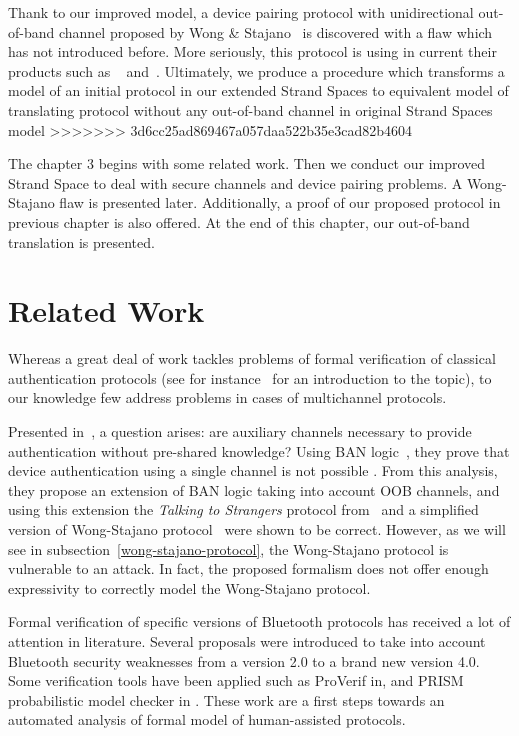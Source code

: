 Thank to our improved model, a device pairing protocol with unidirectional out-of-band channel proposed by Wong \& Stajano~\cite{10.1109/MPRV.2007.76} is discovered with a flaw which has not introduced before. More seriously, this protocol is using in current their products such as ~\cite{Stajano:2011aa} and~\cite{Stajano:2014aa}. Ultimately, we produce a procedure which transforms a model of an initial protocol in our extended Strand Spaces to equivalent model of translating protocol without any out-of-band channel in original Strand Spaces model
>>>>>>> 3d6cc25ad869467a057daa522b35e3cad82b4604

The chapter 3 begins with some related work. Then we conduct our improved Strand Space to deal with secure channels and device pairing problems. A Wong-Stajano flaw is presented later. Additionally, a proof of our proposed protocol in previous chapter is also offered. At the end of this chapter, our out-of-band translation is presented. 

\section{Related Work}
Whereas a great deal of work tackles problems of formal verification of classical authentication protocols (see for instance~\cite{Ryan:2000:MAS:1407727} for an introduction to the topic), to our knowledge few address problems in cases of multichannel protocols.

Presented in~\cite{jisis11-1-1-07}, a question arises: are auxiliary channels necessary to provide authentication without pre-shared knowledge? Using BAN logic~\cite{Burrows90alogic}, they prove that device authentication using a single channel is not possible . From this analysis, they propose an extension of BAN logic taking into account OOB channels, and using this extension the \textit{Talking to Strangers} protocol from~\cite{Smetters02talkingto} and a simplified version of Wong-Stajano protocol~\cite{10.1109/MPRV.2007.76} were shown to be correct. However, as we will see in subsection~\ref{wong-stajano-protocol}, the Wong-Stajano protocol is vulnerable to an attack. In fact, the proposed formalism does not offer enough expressivity to correctly model the Wong-Stajano protocol.
 
Formal verification of specific versions of Bluetooth protocols has received a lot of attention in literature. Several proposals were introduced to take into account Bluetooth security weaknesses from a version 2.0 to a brand new version 4.0. Some verification tools have been applied such as ProVerif in\cite{Chang_formalanalysis}, and PRISM probabilistic model checker in \cite{Duflot:2006rm}. These work are a first steps towards an automated analysis of formal model of human-assisted protocols. 

